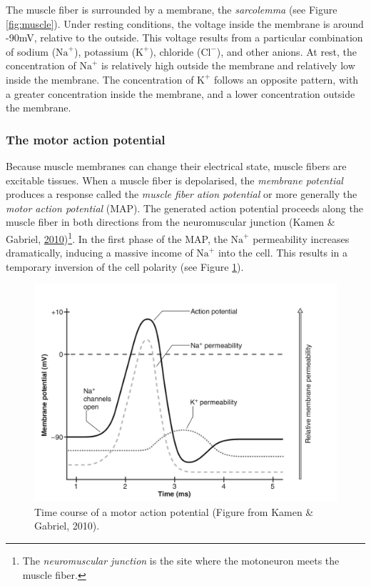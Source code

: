 \documentclass[a4paper,12pt,twoside,openright,oldfontcommands]{memoir}
\let\rmarkdownfootnote\footnote%
\def\footnote{\protect\rmarkdownfootnote}
\begin{document}
The muscle fiber is surrounded by a membrane, the \emph{sarcolemma} (see
Figure \ref{fig:muscle}). Under resting conditions, the voltage inside
the membrane is around -90mV, relative to the outside. This voltage
results from a particular combination of sodium (\(\text{Na}^{+}\)),
potassium (\(\text{K}^{+}\)), chloride (\(\text{Cl}^{-}\)), and other
anions. At rest, the concentration of \(\text{Na}^{+}\) is relatively
high outside the membrane and relatively low inside the membrane. The
concentration of \(\text{K}^{+}\) follows an opposite pattern, with a
greater concentration inside the membrane, and a lower concentration
outside the membrane.

\subsubsection{The motor action
potential}\label{the-motor-action-potential}

Because muscle membranes can change their electrical state, muscle
fibers are excitable tissues. When a muscle fiber is depolarised, the
\emph{membrane potential} produces a response called the \emph{muscle
fiber ation potential} or more generally the \emph{motor action
potential} (MAP). The generated action potential proceeds along the
muscle fiber in both directions from the neuromuscular junction (Kamen
\& Gabriel,
\protect\hyperlink{ref-kamen_essentials_2010}{2010})\footnote{The
  \emph{neuromuscular junction} is the site where the motoneuron meets
  the muscle fiber.}. In the first phase of the MAP, the
\(\text{Na}^{+}\) permeability increases dramatically, inducing a
massive income of \(\text{Na}^{+}\) into the cell. This results in a
temporary inversion of the cell polarity (see Figure \ref{fig:mfap}).

\begin{figure}[H]

{\centering \includegraphics[width=0.75\linewidth]{assets/mfap} 

}

\caption{Time course of a motor action potential (Figure from Kamen \& Gabriel, 2010).}\label{fig:mfap}
\end{figure}
\end{document}
